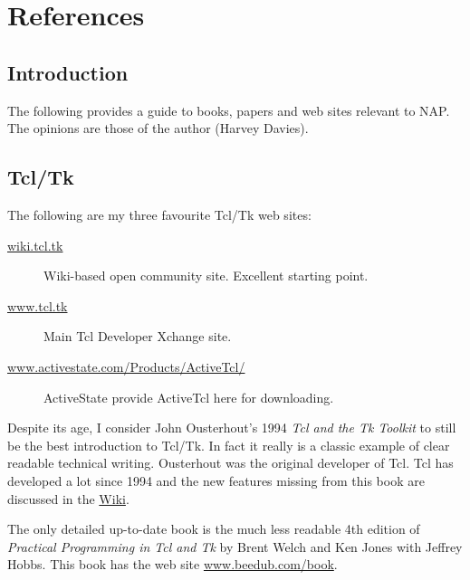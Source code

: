     \section{References}

  \subsection{
    \label{Introduction}Introduction
  }
The following provides a guide to books, papers and web sites
  relevant to NAP. The opinions are those of the author (Harvey
  Davies).
  \subsection{
    \label{tcl}Tcl/Tk
  }
The following are my three favourite Tcl/Tk web sites:
  \begin{description}
    \item[
      \href{http://wiki.tcl.tk}{wiki.tcl.tk}
    ]
    Wiki-based open community site. Excellent starting point.
    \item[
      \href{http://www.tcl.tk}{www.tcl.tk}
    ]
    Main Tcl Developer Xchange site.
    \item[
      \href{http://www.activestate.com/Products/ActiveTcl/}{www.activestate.com/Products/ActiveTcl/}
    ]
    ActiveState provide ActiveTcl here for downloading.
  \end{description}
  \par Despite its age, I consider John Ousterhout's 1994 
  \emph{Tcl and the Tk Toolkit} to still be the best introduction
  to Tcl/Tk. In fact it really is a classic example of clear readable
  technical writing. Ousterhout was the original developer of Tcl. Tcl
  has developed a lot since 1994 and the new features missing from this
  book are discussed in the 
  \href{http://wiki.tcl.tk/103}{Wiki}.
  \par The only detailed up-to-date book is the much less readable 4th
  edition of 
  \emph{Practical Programming in Tcl and Tk} by Brent Welch and
  Ken Jones with Jeffrey Hobbs. This book has the web site 
  \href{http://www.beedub.com/book}{www.beedub.com/book}.
